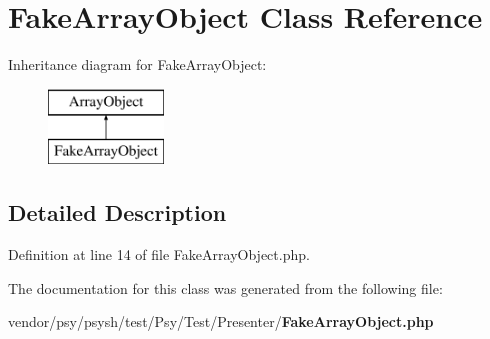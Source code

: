 \section{Fake\+Array\+Object Class Reference}
\label{class_psy_1_1_test_1_1_presenter_1_1_fake_array_object}
Inheritance diagram for Fake\+Array\+Object\+:\begin{figure}[H]
\begin{center}
\leavevmode
\includegraphics[height=2.000000cm]{class_psy_1_1_test_1_1_presenter_1_1_fake_array_object}
\end{center}
\end{figure}


\subsection{Detailed Description}


Definition at line 14 of file Fake\+Array\+Object.\+php.



The documentation for this class was generated from the following file\+:\begin{DoxyCompactItemize}
\item 
vendor/psy/psysh/test/\+Psy/\+Test/\+Presenter/{\bf Fake\+Array\+Object.\+php}\end{DoxyCompactItemize}
